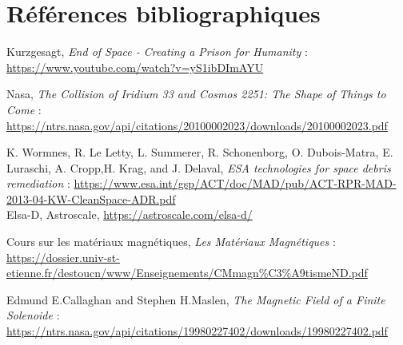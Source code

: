 \documentclass[a4paper,1pt]{article}
\begin{document}
\section{Références bibliographiques}
\begin{thebibliography}{11}
	Kurzgesagt, \textit{End of Space - Creating a Prison for Humanity} :
	\url{https://www.youtube.com/watch?v=yS1ibDImAYU}

    Nasa, \textit{The Collision of Iridium 33 and Cosmos 2251: The Shape of Things to Come} : \url{https://ntrs.nasa.gov/api/citations/20100002023/downloads/20100002023.pdf}

K. Wormnes, R. Le Letty, L. Summerer, R. Schonenborg, O. Dubois-Matra, E. Luraschi, A. Cropp,H. Krag, and J. Delaval, \textit{ESA technologies for space debris remediation} :
	\url{https://www.esa.int/gsp/ACT/doc/MAD/pub/ACT-RPR-MAD-2013-04-KW-CleanSpace-ADR.pdf}\\

 Elsa-D, Astroscale, \url{https://astroscale.com/elsa-d/}

Cours sur les matériaux magnétiques, \textit{Les Matériaux Magnétiques} : \url{https://dossier.univ-st-etienne.fr/destoucn/www/Enseignements/CMmagn%C3%A9tismeND.pdf}

Edmund E.Callaghan and Stephen H.Maslen, \textit{The Magnetic Field of a Finite Solenoide} : \url{https://ntrs.nasa.gov/api/citations/19980227402/downloads/19980227402.pdf}
\end{thebibliography}
\end{document}
